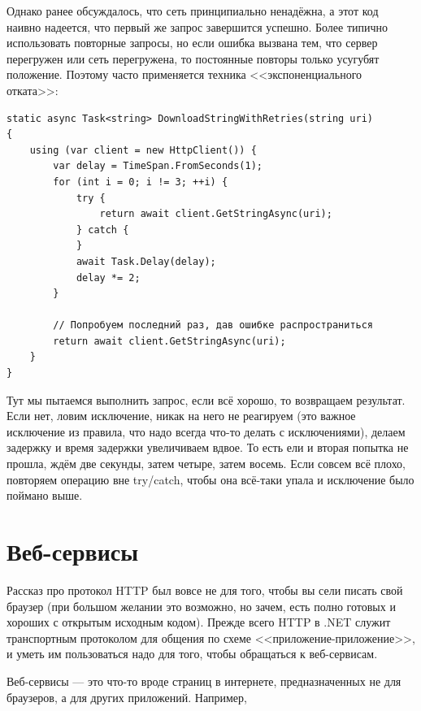 \documentclass{../../text-style}
\begin{document}
Однако ранее обсуждалось, что сеть принципиально ненадёжна, а этот код наивно надеется, что первый же запрос завершится успешно. Более типично использовать повторные запросы, но если ошибка вызвана тем, что сервер перегружен или сеть перегружена, то постоянные повторы только усугубят положение. Поэтому часто применяется техника <<экспоненциального отката>>:

\begin{verbatim}
static async Task<string> DownloadStringWithRetries(string uri)
{
    using (var client = new HttpClient()) {
        var delay = TimeSpan.FromSeconds(1);
        for (int i = 0; i != 3; ++i) {
            try {
                return await client.GetStringAsync(uri);
            } catch {
            }
            await Task.Delay(delay);
            delay *= 2;
        }

        // Попробуем последний раз, дав ошибке распространиться
        return await client.GetStringAsync(uri);
    }
}
\end{verbatim}

Тут мы пытаемся выполнить запрос, если всё хорошо, то возвращаем результат. Если нет, ловим исключение, никак на него не реагируем (это важное исключение из правила, что надо всегда что-то делать с исключениями), делаем задержку и время задержки увеличиваем вдвое. То есть ели и вторая попытка не прошла, ждём две секунды, затем четыре, затем восемь. Если совсем всё плохо, повторяем операцию вне try/catch, чтобы она всё-таки упала и исключение было поймано выше.

\section{Веб-сервисы}

Рассказ про протокол HTTP был вовсе не для того, чтобы вы сели писать свой браузер (при большом желании это возможно, но зачем, есть полно готовых и хороших с открытым исходным кодом). Прежде всего HTTP в .NET служит транспортным протоколом для общения по схеме <<приложение-приложение>>, и уметь им пользоваться надо для того, чтобы обращаться к веб-сервисам.

Веб-сервисы --- это что-то вроде страниц в интернете, предназначенных не для браузеров, а для других приложений. Например,
\end{document}
